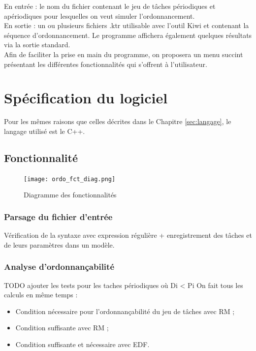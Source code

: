 	En entrée : le nom du fichier contenant le jeu de tâches périodiques et apériodiques pour lesquelles on veut simuler l'ordonnancement.\\
		
	En sortie : un ou plusieurs fichiers .ktr utilisable avec l'outil Kiwi et contenant la séquence d'ordonnancement. Le programme affichera également quelques résultats via la sortie standard.\\
		
		Afin de faciliter la prise en main du programme, on proposera un menu succint présentant les différentes fonctionnalités qui s'offrent à l'utilisateur.
	
	\section{Spécification du logiciel}
		Pour les mêmes raisons que celles décrites dans le Chapitre \ref{sec:langage}, le langage utilisé est le C++.

		\subsection{Fonctionnalité}
			\begin{figure}
				\centering
				\texttt{[image: ordo\_fct\_diag.png]}
				\caption{Diagramme des fonctionnalités}
			\end{figure}
			\FloatBarrier
			
			\subsubsection{Parsage du fichier d'entrée}
				Vérification de la syntaxe avec expression régulière + enregistrement des tâches et de leurs paramètres dans un modèle.
			
			\subsubsection{Analyse d'ordonnançabilité}
				{\Huge TODO ajouter les tests pour les taches périodiques où Di < Pi}
				On fait tous les calculs en même temps :
				\begin{itemize}
					\item Condition nécessaire pour l'ordonnançabilité du jeu de tâches avec RM ;
					\item Condition suffisante avec RM ;
					\item Condition suffisante et nécessaire avec EDF.
				\end{itemize}
			
